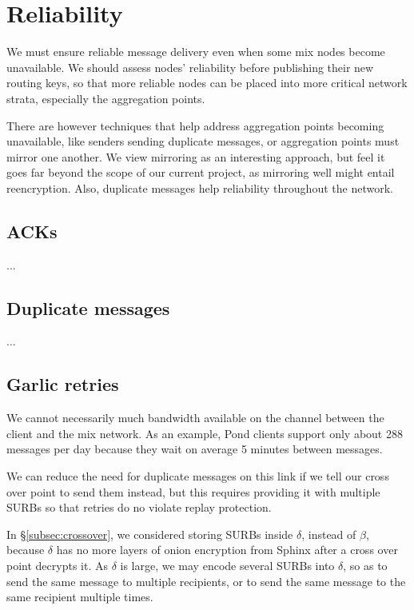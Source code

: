 
\section{Reliability}

We must ensure reliable message delivery even when some mix nodes
become unavailable.  We should assess nodes' reliability before
publishing their new routing keys, so that more reliable nodes can
be placed into more critical network strata, especially the
aggregation points.

There are however techniques that help address aggregation points
becoming unavailable, like senders sending duplicate messages,
 or aggregation points must mirror one another.
We view mirroring as an interesting approach, but feel it goes far
beyond the scope of our current project, as mirroring well might
entail reencryption.  Also, duplicate messages help reliability
throughout the network.


\subsection{ACKs}

...


\subsection{Duplicate messages}

...


\subsection{Garlic retries}\label{subsec:garlic_retries}

We cannot necessarily much bandwidth available on the channel
between the client and the mix network.  As an example, Pond
clients support only about 288 messages per day because they
wait on average 5 minutes between messages.

We can reduce the need for duplicate messages on this link if
we tell our cross over point to send them instead, but this requires
providing  it with multiple SURBs so that retries do no violate
replay protection.

In \S\ref{subsec:crossover}, we considered storing SURBs inside
$\delta$, instead of $\beta$, because $\delta$ has no more layers of
onion encryption from Sphinx after a cross over point decrypts it. 
As $\delta$ is large, we may encode several SURBs into $\delta$,
so as to send the same message to multiple recipients, or to send
the same message to the same recipient multiple times.  

